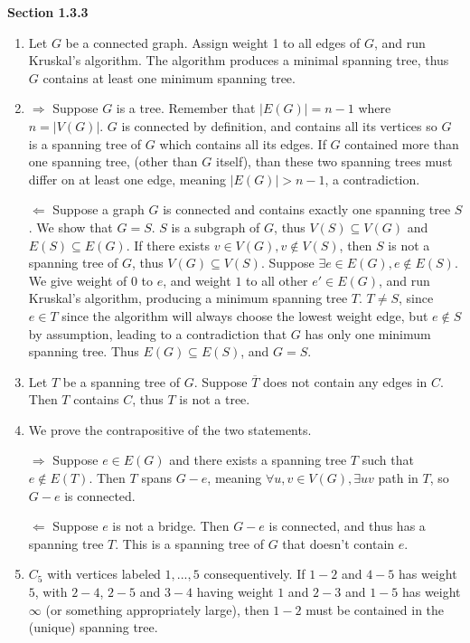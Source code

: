 \documentclass[11pt]{article}
\begin{document}
{\bfseries Section 1.3.3}

\begin{enumerate}[1]
    \item %
        Let $G$ be a connected graph. Assign weight 1 to all edges of $G$, and 
        run Kruskal's algorithm. The algorithm produces a minimal spanning tree,
        thus $G$ contains at least one minimum spanning tree.
    \item %
        $\Rightarrow$ Suppose $G$ is a tree. Remember that $|E(G)| = n - 1$ 
        where $n = |V(G)|$. $G$ is connected by definition,
        and contains all its vertices so $G$ is a spanning tree of $G$ which 
        contains all its edges. If $G$ contained more than one spanning tree, 
        (other than $G$ itself), than these two spanning trees must differ 
        on at least one edge, meaning $|E(G)| > n - 1$, a contradiction. 
        
        $\Leftarrow$ Suppose a graph $G$ is connected and contains exactly one 
        spanning tree $S$. We show that $G = S$. $S$ is a subgraph of $G$, thus
        $V(S) \subseteq V(G)$ and $E(S) \subseteq E(G)$. If there exists 
        $v \in V(G), v \notin V(S)$, then $S$ is not a spanning tree of 
        $G$, thus $V(G) \subseteq V(S)$. Suppose $\exists e \in E(G), e \notin 
        E(S)$. We give weight of $0$ to $e$, and weight $1$ to all other $e' \in
        E(G)$, and run Kruskal's algorithm, producing a minimum spanning tree
        $T$. $T \neq S$, since $e \in T$ since the algorithm will always choose 
        the lowest weight edge, but $e \notin S$ by assumption, leading to 
        a contradiction that $G$ has only one minimum spanning tree. Thus
        $E(G) \subseteq E(S)$, and $G = S$. 

    \item %
        Let $T$ be a spanning tree of $G$. Suppose $\overline{T}$ does not contain
        any edges in $C$. Then $T$ contains $C$, thus $T$ is not a tree. 

    \item %
        We prove the contrapositive of the two statements.

        $\Rightarrow$ Suppose $e \in E(G)$ and 
        there exists a spanning tree $T$ such that $e \notin E(T)$. Then 
        $T$ spans $G - e$, meaning $\forall u,v \in V(G), \exists uv$ path in 
        $T$, so $G - e$ is connected.

        $\Leftarrow$ Suppose $e$ is not a bridge. Then $G - e$ is connected,
        and thus has a spanning tree $T$. This is a spanning tree of $G$ that 
        doesn't contain $e$. 
        \addtocounter{enumi}{2}
    \item
        $C_5$ with vertices labeled $1, ..., 5$ consequentively. If $1-2$ and
        $4-5$ has weight $5$, with $2-4$, $2-5$ and $3-4$ having weight $1$
        and $2-3$ and $1-5$ has weight $\infty$ (or something appropriately 
        large), then $1-2$ must be contained 
        in the (unique) spanning tree. 

        
\end{enumerate}
\end{document}
